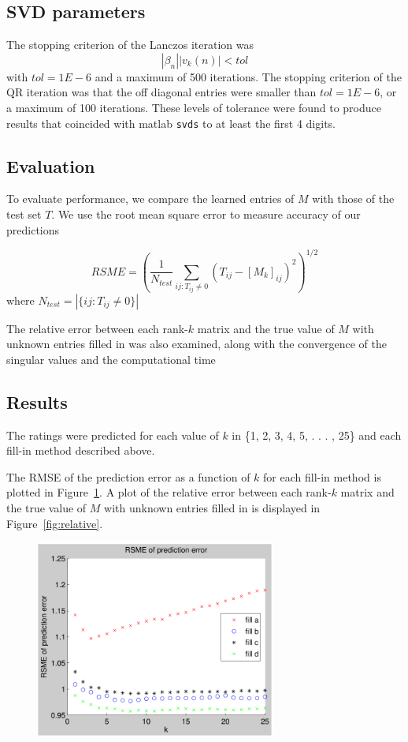 \documentclass[11pt]{article} %
\begin{document}
\subsection{SVD parameters}
The stopping criterion of the Lanczos iteration was
\begin{equation}
| \beta_n | | v_k (n) | < tol
\end{equation}
with $tol = 1E-6$ and a maximum of 500 iterations. The stopping criterion of the QR iteration was that the off diagonal entries were smaller than $tol = 1E-6$, or a maximum of 100 iterations. These levels of tolerance were found to produce results that coincided with matlab \verb$svds$ to at least the first 4 digits.

\subsection{Evaluation}
To evaluate performance, we compare the learned entries of $M$ with those of the test set $T$. We use the root mean square error to measure accuracy of our predictions

\begin{equation}
RSME = \left ( \frac{1}{N_{test}} \sum_{ij:T_{ij}\ne 0} (T_{ij} - [M_k]_{ij})^2 \right )^{1/2}
\end{equation}
where $N_{test} = |\{ij : T_{ij} \ne 0 \} |$


The relative error between each rank-$k$ matrix and the true value of $M$ with unknown entries filled
in was also examined, along with the convergence of the singular values and the computational time

\subsection{Results}
The ratings were predicted for each value of $k$ in \{1, 2, 3, 4, 5, . . . , 25\} and each fill-in method
described above. 

The RMSE of the prediction error as a function of $k$ for each fill-in method is plotted in Figure~\ref{fig:rsme}. A plot of the relative error between each rank-$k$ matrix and the true value of $M$ with unknown entries filled
in is displayed in Figure~\ref{fig:relative}.


\begin{figure}[h!]
  \centering
    \includegraphics[width=0.7\textwidth]{rsme}
  \caption{}
\label{fig:rsme}
\end{figure}
\end{document}
